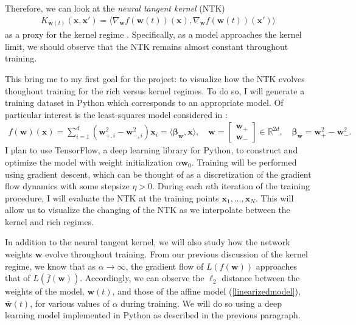\documentclass{article}
\begin{document}
Therefore, we can look at the \textit{neural tangent kernel} (NTK)
\begin{align*}
    K_{\boldsymbol{w}(t)}(\boldsymbol{x}, \boldsymbol{x}') = \langle \nabla_{\boldsymbol{w}} f(\boldsymbol{w}(t))(\boldsymbol{x}), \nabla_{\boldsymbol{w}} f(\boldsymbol{w}(t))(\boldsymbol{x}') \rangle
\end{align*}
as a proxy for the kernel regime \cite{jacot2018neural}. Specifically, as a model approaches the kernel limit, we should observe that the NTK remains almost constant throughout training. 

This bring me to my first goal for the project: to visualize how the NTK evolves thoughout training for the rich versus kernel regimes. To do so, I will generate a training dataset in Python which corresponds to an appropriate model. Of particular interest is the least-squares model considered in \cite{woodworth2020kernel}:
\begin{align*}
    f(\boldsymbol{w})(\boldsymbol{x}) = \sum_{i=1}^d (\boldsymbol{w}_{+, i}^2 - \boldsymbol{w}_{-, i}^2)\boldsymbol{x}_i = \langle \boldsymbol{\beta}_{\boldsymbol{w}}, \boldsymbol{x} \rangle, \quad \boldsymbol{w} = \begin{bmatrix}
                        \boldsymbol{w}_+ \\
                        \boldsymbol{w}_-
                        \end{bmatrix} \in \mathbb{R}^{2d},
    \quad \boldsymbol{\beta}_{\boldsymbol{w}} = \boldsymbol{w}_+^2 - \boldsymbol{w}_-^2.
\end{align*}
I plan to use TensorFlow, a deep learning library for Python, to construct and optimize the model with weight initialization $\alpha \boldsymbol{w}_0$. Training will be performed using gradient descent, which can be thought of as a discretization of the gradient flow dynamics with some stepsize $\eta > 0$. During each $n$th iteration of the training procedure, I will evaluate the NTK at the training points $\boldsymbol{x}_1, \ldots, \boldsymbol{x}_N$. This will allow us to visualize the changing of the NTK as we interpolate between the kernel and rich regimes.

In addition to the neural tangent kernel, we will also study how the network weights $\boldsymbol{w}$ evolve throughout training. From our previous discussion of the kernel regime, we know that as $\alpha \rightarrow \infty$, the gradient flow of $L(f(\boldsymbol{w}))$ approaches that of $L(\bar{f}(\boldsymbol{w}))$. Accordingly, we can observe the $\ell_2$ distance between the weights of the model, $\boldsymbol{w}(t)$, and those of the affine model (\ref{linearizedmodel}), $\bar{\boldsymbol{w}}(t)$, for various values of $\alpha$ during training. We will do so using a deep learning model implemented in Python as described in the previous paragraph.
\end{document}
